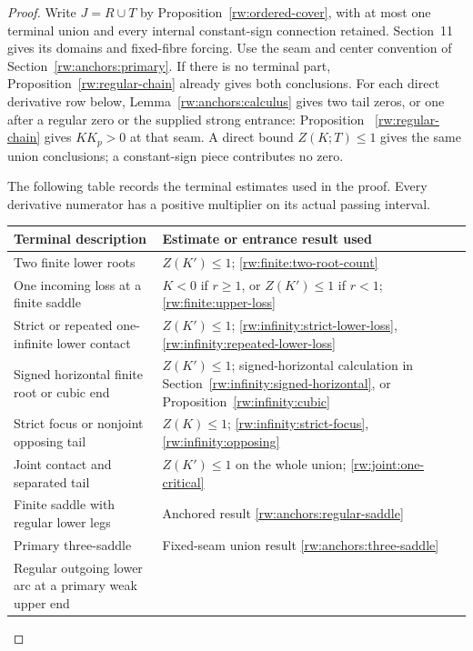 \begin{proof}
Write $J=R\cup T$ by Proposition~\ref{rw:ordered-cover}, with at
most one terminal union and every internal constant-sign connection
retained. Section~11 gives its domains and fixed-fibre forcing.
Use the seam and center convention of Section~\ref{rw:anchors:primary}.
If there is no terminal part, Proposition~\ref{rw:regular-chain}
already gives both conclusions.
For each direct derivative row below,
Lemma~\ref{rw:anchors:calculus} gives two tail zeros, or one after
a regular zero or the supplied strong entrance: Proposition
~\ref{rw:regular-chain} gives $KK_p>0$ at that seam.
A direct bound $Z(K;T)\le1$ gives the same union conclusions;
a constant-sign piece contributes no zero.

The following table records the terminal estimates used in the proof.
Every derivative numerator has a positive multiplier on its actual
passing interval.
\begin{center}\small
\begin{tabularx}{\linewidth}{@{}p{.42\linewidth}X@{}}
\toprule
 Terminal description & Estimate or entrance result used\\ \midrule
 Two finite lower roots
       &$Z(K')\le1$; \ref{rw:finite:two-root-count}\\
 One incoming loss at a finite saddle
       &$K<0$ if $r\ge1$, or $Z(K')\le1$ if $r<1$;
                         \ref{rw:finite:upper-loss}\\
 Strict or repeated one-infinite lower contact
       &$Z(K')\le1$; \ref{rw:infinity:strict-lower-loss},
                         \ref{rw:infinity:repeated-lower-loss}\\
 Signed horizontal finite root or cubic end
       &$Z(K')\le1$; signed-horizontal calculation in
          Section~\ref{rw:infinity:signed-horizontal}, or
          Proposition~\ref{rw:infinity:cubic}\\
 Strict focus or nonjoint opposing tail
       &$Z(K)\le1$; \ref{rw:infinity:strict-focus},
                         \ref{rw:infinity:opposing}\\
 Joint contact and separated tail
       &$Z(K')\le1$ on the whole union;
                         \ref{rw:joint:one-critical}\\
 Finite saddle with regular lower legs
       &Anchored result \ref{rw:anchors:regular-saddle}\\
 Primary three-saddle
       &Fixed-seam union result \ref{rw:anchors:three-saddle}\\
 Regular outgoing lower arc at a primary weak upper end

\end{tabularx}
\end{center}
\end{proof}

